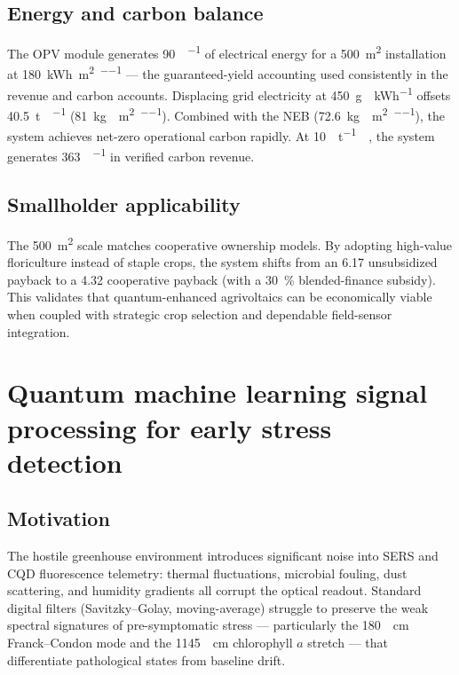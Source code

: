 \documentclass[11pt,a4paper]{article}
\begin{document}
\subsection{Energy and carbon balance}

The OPV module generates \qty{90}{\MWh\per\yr} of electrical energy for a \qty{500}{\m\squared} installation at \qty{180}{\kWh\per\m\squared\per\yr} --- the guaranteed-yield accounting used consistently in the revenue and carbon accounts. Displacing grid electricity at \qty{450}{\g{}\per\kWh} offsets \qty{40.5}{\tonne{}\per\yr} (\qty{81}{\kg{}\per\m\squared\per\yr}). Combined with the NEB (\qty{72.6}{\kg{}\per\m\squared\per\yr}), the system achieves net-zero operational carbon rapidly. At \qty{10}{\USD\per\tonne{}}~\cite{ICVCM2024}, the system generates \qty{363}{\USD\per\yr} in verified carbon revenue.

\subsection{Smallholder applicability}

The \qty{500}{\m\squared} scale matches cooperative ownership models. By adopting high-value floriculture instead of staple crops, the system shifts from an \qty{6.17}{\yr} unsubsidized payback to a \qty{4.32}{\yr} cooperative payback (with a \qty{30}{\percent} blended-finance subsidy). This validates that quantum-enhanced agrivoltaics can be economically viable when coupled with strategic crop selection and dependable field-sensor integration.


\section{Quantum machine learning signal processing for early stress detection}
\label{SI-sec:qml}

\subsection{Motivation}

The hostile greenhouse environment introduces significant noise into SERS and CQD fluorescence telemetry: thermal fluctuations, microbial fouling, dust scattering, and humidity gradients all corrupt the optical readout. Standard digital filters (Savitzky--Golay, moving-average) struggle to preserve the weak spectral signatures of pre-symptomatic stress --- particularly the \qty{180}{\per\cm} Franck--Condon mode and the \qty{1145}{\per\cm} chlorophyll $a$  stretch --- that differentiate pathological states from baseline drift.
\end{document}
